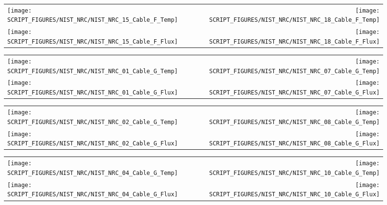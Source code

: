 \clearpage

\begin{figure}[!ht]
\begin{tabular*}{\textwidth}{l@{\extracolsep{\fill}}r}
\texttt{[image: SCRIPT\_FIGURES/NIST\_NRC/NIST\_NRC\_15\_Cable\_F\_Temp]} &
\texttt{[image: SCRIPT\_FIGURES/NIST\_NRC/NIST\_NRC\_18\_Cable\_F\_Temp]} \\
\texttt{[image: SCRIPT\_FIGURES/NIST\_NRC/NIST\_NRC\_15\_Cable\_F\_Flux]} &
\texttt{[image: SCRIPT\_FIGURES/NIST\_NRC/NIST\_NRC\_18\_Cable\_F\_Flux]}
\end{tabular*}
\label{NIST_NRC_F_15_and_18}
\end{figure}

\clearpage

\begin{figure}[!ht]
\begin{tabular*}{\textwidth}{l@{\extracolsep{\fill}}r}
\texttt{[image: SCRIPT\_FIGURES/NIST\_NRC/NIST\_NRC\_01\_Cable\_G\_Temp]} &
\texttt{[image: SCRIPT\_FIGURES/NIST\_NRC/NIST\_NRC\_07\_Cable\_G\_Temp]} \\
\texttt{[image: SCRIPT\_FIGURES/NIST\_NRC/NIST\_NRC\_01\_Cable\_G\_Flux]} &
\texttt{[image: SCRIPT\_FIGURES/NIST\_NRC/NIST\_NRC\_07\_Cable\_G\_Flux]}
\end{tabular*}
\label{NIST_NRC_G_1_and_7}
\end{figure}

\begin{figure}[!ht]
\begin{tabular*}{\textwidth}{l@{\extracolsep{\fill}}r}
\texttt{[image: SCRIPT\_FIGURES/NIST\_NRC/NIST\_NRC\_02\_Cable\_G\_Temp]} &
\texttt{[image: SCRIPT\_FIGURES/NIST\_NRC/NIST\_NRC\_08\_Cable\_G\_Temp]} \\
\texttt{[image: SCRIPT\_FIGURES/NIST\_NRC/NIST\_NRC\_02\_Cable\_G\_Flux]} &
\texttt{[image: SCRIPT\_FIGURES/NIST\_NRC/NIST\_NRC\_08\_Cable\_G\_Flux]}
\end{tabular*}
\label{NIST_NRC_G_2_and_8}
\end{figure}

\clearpage

\begin{figure}[!ht]
\begin{tabular*}{\textwidth}{l@{\extracolsep{\fill}}r}
\texttt{[image: SCRIPT\_FIGURES/NIST\_NRC/NIST\_NRC\_04\_Cable\_G\_Temp]} &
\texttt{[image: SCRIPT\_FIGURES/NIST\_NRC/NIST\_NRC\_10\_Cable\_G\_Temp]} \\
\texttt{[image: SCRIPT\_FIGURES/NIST\_NRC/NIST\_NRC\_04\_Cable\_G\_Flux]} &
\texttt{[image: SCRIPT\_FIGURES/NIST\_NRC/NIST\_NRC\_10\_Cable\_G\_Flux]}
\end{tabular*}
\label{NIST_NRC_G_4_and_10}
\end{figure}

